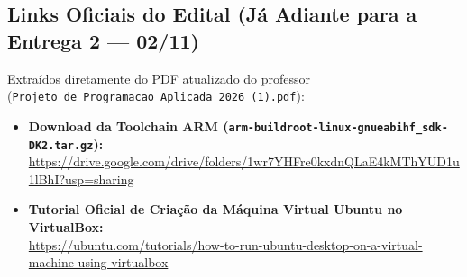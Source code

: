 \documentclass[11pt,a4paper]{article}
\begin{document}
\subsection{Links Oficiais do Edital (Já Adiante para a Entrega 2 --- 02/11)}
Extraídos diretamente do PDF atualizado do professor (\texttt{Projeto\_de\_Programacao\_Aplicada\_2026 (1).pdf}):
\begin{itemize}[leftmargin=*]
    \item \textbf{Download da Toolchain ARM (\texttt{arm-buildroot-linux-gnueabihf\_sdk-DK2.tar.gz}):} \\
    \url{https://drive.google.com/drive/folders/1wr7YHFre0kxdnQLaE4kMThYUD1u1lBhI?usp=sharing}
    \item \textbf{Tutorial Oficial de Criação da Máquina Virtual Ubuntu no VirtualBox:} \\
    \url{https://ubuntu.com/tutorials/how-to-run-ubuntu-desktop-on-a-virtual-machine-using-virtualbox}
\end{itemize}
\end{document}
